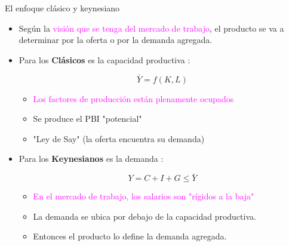\documentclass{beamer}
\begin{document}
\begin{frame}{El enfoque clásico y keynesiano}

    \begin{itemize}
        \item Según la \textcolor{magenta}{visión que se tenga del mercado de trabajo}, el producto se va a determinar por la oferta o por la demanda agregada. 
        \item Para los \textbf{Clásicos} es la capacidad productiva \faCogs:
            \begin{center}
            \begin{tcolorbox}[width=2in, boxsep=0pt, left=0pt, right=0pt, top=2pt, ,colframe = blue!70!black, colback = blue!7!white ]%
                    $$ \bar{Y}=f(K, L) $$
             \end{tcolorbox}
             \end{center}
             
            \begin{itemize}
            \item \textcolor{magenta}{Los factores de producción están plenamente ocupados}
            \item Se produce el PBI "potencial"
              \item "Ley de Say" (la oferta encuentra su demanda)
            \end{itemize}
            
        \vspace{2mm}
        \item Para los \textbf{Keynesianos} es la demanda \faCartPlus:
            
            \begin{center}
            \begin{tcolorbox}[width=2in, boxsep=0pt, left=0pt, right=0pt, top=2pt, ,colframe = blue!70!black, colback = blue!7!white]%
                    $$ Y = C + I + G  \leq \bar{Y} $$
             \end{tcolorbox}
             \end{center}
             
            \begin{itemize}
            \item  \textcolor{magenta}{En el mercado de trabajo, los salarios son "rígidos a la baja"}
            \item La demanda se ubica por debajo de la capacidad productiva. 
            \item Entonces el producto lo define la demanda agregada.
            \end{itemize}
    \end{itemize}

\end{frame}
\end{document}
